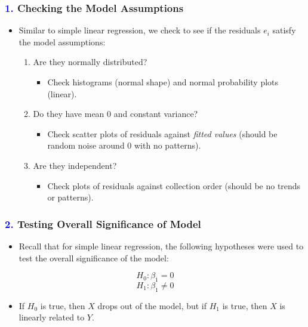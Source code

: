 \documentclass[14pt]{beamer}
\begin{document}
\begin{frame}
	\frametitle{\textcolor{blue}{1.} Checking the Model Assumptions}
	
	\begin{itemize}[label={\color{blue}$\blacktriangleright$}]
		\item Similar to simple linear regression, we check to see if the residuals $e_i$ satisfy the model assumptions:
	
	
	\begin{enumerate}[label=\textcolor{blue}{(\alph*).}]
		\item Are they normally distributed?
		\begin{itemize}[label={\color{blue}$\blacktriangleright$}]
			\item Check histograms (normal shape) and normal probability plots (linear).
		\end{itemize}
		
		\item Do they have mean 0 and constant variance?
		\begin{itemize}[label={\color{blue}$\blacktriangleright$}]
			\item Check scatter plots of residuals against \textit{fitted values} (should be random noise around 0 with no patterns).
		\end{itemize}
		
		\item Are they independent?
		\begin{itemize}[label={\color{blue}$\blacktriangleright$}]
			\item Check plots of residuals against collection order (should be no trends or patterns).
		\end{itemize}
	\end{enumerate}
\end{itemize}
	
\end{frame}
\begin{frame}
	\frametitle{\textcolor{blue}{2.} Testing Overall Significance of Model}
	
	\begin{itemize}[label={\color{blue}$\blacktriangleright$}]
		\item Recall that for simple linear regression, the following hypotheses were used to test the overall significance of the model:
	\end{itemize}
	
	\[
	H_0 : \beta_1 = 0
	\]
	\[
	H_1 : \beta_1 \neq 0
	\]
	
	\begin{itemize}[label={\color{blue}$\blacktriangleright$}]
		\item If $H_0$ is true, then $X$ drops out of the model, but if $H_1$ is true, then $X$ is linearly related to $Y$.
	\end{itemize}
	
\end{frame}
\end{document}
